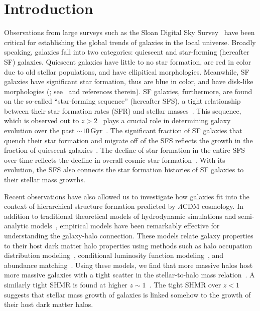\documentclass[12pt, letterpaper, preprint, tighten]{aastex62}
\newcommand{\edt}[1]{{\color{dred}{\bf} #1}}
\begin{document}
\section{Introduction}
Observations from large surveys such as the Sloan Digital Sky Survey~\citep[SDSS;][]{york2000}
have been critical for establishing the global trends of galaxies in
the local universe. Broadly speaking, galaxies fall into two categories:
quiescent and star-forming (hereafter SF) galaxies. Quiescent galaxies
have little to no star formation, are red in color
\edt{due to old stellar populations},
and have ellipitical
morphologies. Meanwhile, SF galaxies have significant star formation,
\edt{thus}
are blue in color, and have disk-like morphologies (\citealt{kauffmann2003, blanton2003, baldry2006, taylor2009, moustakas2013};
see~\citealt{blanton2009} and references therein).
SF galaxies, furthermore, are found on the so-called ``star-forming sequence''
(hereafter SFS), a tight relationship between their star formation rates (SFR)
and stellar masses~\citep[][see also Figure~\ref{fig:groupcat}]{noeske2007, daddi2007, salim2007, speagle2014, lee2015}.
This sequence, which is observed out to $z > 2$~\citep{wang2013, leja2015}
plays a crucial role in
\edt{determining}
galaxy evolution over the past ${\sim}10\,\mathrm{Gyr}$~\citep[see][for an alternative point of view]{kelson2014,abramson2016}.
The significant fraction of SF galaxies that quench their
star formation and migrate off of the SFS reflects the growth in the
fraction of quiescent galaxies~\citep{blanton2006, borch2006, bundy2006, moustakas2013}.
The decline of star formation in the entire SFS~\citep{lee2015, schreiber2015}
over time reflects the decline in overall cosmic star formation~\citep{hopkins2006, behroozi2013, madau2014}.
With its evolution, the SFS also connects the star formation histories of SF
galaxies to their stellar mass growths.

Recent observations have also allowed us to investigate how galaxies fit
into the context of hierarchical structure formation predicted by 
$\Lambda$CDM cosmology. In addition to traditional theoretical
models of hydrodynamic simulations and semi-analytic
models~\citep[see][for reviews]{silk2012, somerville2015},
empirical models 
\edt{have been remarkably effective} 
for understanding the galaxy-halo connection. These models relate galaxy
properties to their host dark matter halo properties using methods such as
halo occupation distribution modeling~\citep[HOD; \emph{e.g.}][]{zheng2007,zehavi2011,leauthaud2012,parejko2013,zu2015},
\edt{conditional} luminosity function modeling~\citep[\emph{e.g.}][]{yang2009}, and abundance
matching~\citep[\emph{e.g.}][]{kravtsov2004, vale2006, conroy2009, moster2013, reddick2013}.
Using these models, we find that more massive halos host more
massive galaxies with a tight scatter in the stellar-to-halo
mass relation~\citep[hereafter SHMR;][]{mandelbaum2006a, conroy2007, more2011, leauthaud2012, tinker2013, velander2014, han2015, zu2015, gu2016, lange2018a}. 
A similarly tight SHMR is found at higher
$z\sim1$~\citep{leauthaud2012, tinker2013, patel2015}. 
\edt{The tight SHMR over $z < 1$}
suggests that stellar
mass growth of galaxies is linked somehow to the growth
of their host dark matter halos.
\end{document}
